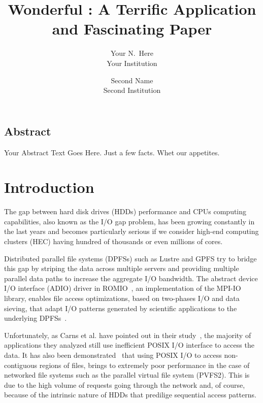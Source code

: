 \documentclass[letterpaper,twocolumn,10pt]{article}
\begin{document}
\date{}

\title{\Large \bf Wonderful : A Terrific Application and Fascinating Paper}

\author{
{\rm Your N.\ Here}\\
Your Institution
\and
{\rm Second Name}\\
Second Institution
} %

\maketitle

\thispagestyle{empty}


\subsection*{Abstract}
Your Abstract Text Goes Here.  Just a few facts.
Whet our appetites.

\section{Introduction}

The gap between hard disk drives (HDDs) performance and CPUs computing capabilities, also known as the I/O gap problem, has been growing constantly in the last years and becomes particularly serious if we consider high-end computing clusters (HEC) having hundred of thousands or even millions of cores. 

Distributed parallel file systems (DPFSs) such as Lustre and GPFS try to bridge this gap by striping the data across multiple servers and providing multiple parallel data paths to increase the aggregate I/O bandwidth. The abstract device I/O interface (ADIO) driver in ROMIO~\cite{ThakurGL96}, an implementation of the MPI-IO library, enables file access optimizations, based on two-phases I/O and data sieving, that adapt I/O patterns generated by scientific applications to the underlying DPFSs~\cite{ThakurGL99}. 

Unfortunately, as Carns et al. have pointed out in their study~\cite{CarnsHABLLR11}, the majority of applications they analyzed still use inefficient POSIX I/O interface to access the data. It has also been demonstrated~\cite{ChingCLP06} that using POSIX I/O to access non-contiguous regions of files, brings to extremely poor performance in the case of networked file systems such as the parallel virtual file system (PVFS2). This is due to the high volume of requests going through the network and, of course, because of the intrinsic nature of HDDs that predilige sequential access patterns.
\end{document}
